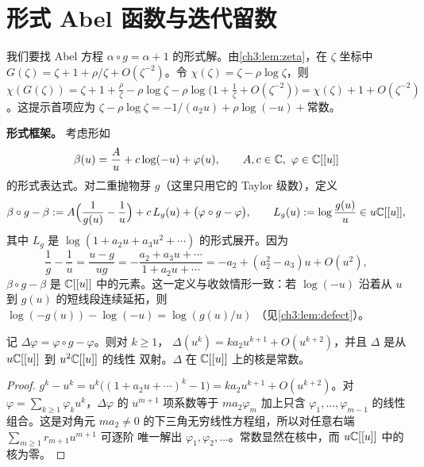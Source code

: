 \section{形式 Abel 函数与迭代留数}\label{ch3:sec:formal}

我们要找 Abel 方程 $\alpha\circ g=\alpha+1$ 的形式解。由\cref{ch3:lem:zeta}，在 $\zeta$
坐标中 $G(\zeta)=\zeta+1+\rho/\zeta+O(\zeta^{-2})$。令 $\chi(\zeta)=\zeta-\rho\log\zeta$，则
$\chi(G(\zeta))=\zeta+1+\frac\rho\zeta-\rho\log\zeta-\rho\log\bigl(1+\frac1\zeta+O(\zeta^{-2})\bigr)=\chi(\zeta)+1+O(\zeta^{-2})$。这提示首项应为
$\zeta-\rho\log\zeta=-1/(a_2u)+\rho\log(-u)+\text{常数}$。

\textbf{形式框架。} 考虑形如
\begin{equation}\label{ch3:eq:class}
 \beta(u)=\frac{A}{u}+c\log(-u)+\varphi(u),\qquad A,c\in\C,\ \varphi\in\C[[u]]
\end{equation}
的形式表达式。对二重抛物芽 $g$（这里只用它的 Taylor 级数），定义
\[
 \beta\circ g-\beta:=A\Bigl(\frac1{g(u)}-\frac1u\Bigr)+c\,L_g(u)+\bigl(\varphi\circ g-\varphi\bigr),
 \qquad L_g(u):=\log\frac{g(u)}{u}\in u\mathbb{C}[[u]] ,
\]
其中 $L_g$ 是 $\log(1+a_2u+a_3u^2+\cdots)$ 的形式展开。因为
\begin{equation}\label{ch3:eq:inv-diff}
 \frac1{g}-\frac1u=\frac{u-g}{ug}=-\frac{a_2+a_3u+\cdots}{1+a_2u+\cdots}
 =-a_2+(a_2^2-a_3)u+O(u^2),
\end{equation}
$\beta\circ g-\beta$ 是 $\mathbb{C}[[u]]$ 中的元素。这一定义与收敛情形一致：若 $\log(-u)$
沿着从 $u$ 到 $g(u)$ 的短线段连续延拓，则 $\log(-g(u))-\log(-u)=\log(g(u)/u)$
（见\cref{ch3:lem:defect}）。

\begin{lemma}[差分算子]\label{ch3:lem:Delta}
记 $\Delta\varphi=\varphi\circ g-\varphi$。则对 $k\ge1$，
$\Delta(u^k)=ka_2u^{k+1}+O(u^{k+2})$，并且 $\Delta$ 是从 $u\mathbb{C}[[u]]$ 到 $u^2\mathbb{C}[[u]]$ 的线性
双射。$\Delta$ 在 $\mathbb{C}[[u]]$ 上的核是常数。
\end{lemma}

\begin{proof}
$g^k-u^k=u^k\bigl((1+a_2u+\cdots)^k-1\bigr)=ka_2u^{k+1}+O(u^{k+2})$。对
$\varphi=\sum_{k\ge1}\varphi_ku^k$，$\Delta\varphi$ 的 $u^{m+1}$ 项系数等于
$ma_2\varphi_m$ 加上只含 $\varphi_1,\dots,\varphi_{m-1}$ 的线性组合。这是对角元
$ma_2\ne0$ 的下三角无穷线性方程组，所以对任意右端 $\sum_{m\ge1}r_{m+1}u^{m+1}$ 可逐阶
唯一解出 $\varphi_1,\varphi_2,\dots$。常数显然在核中，而 $u\mathbb{C}[[u]]$ 中的核为零。
\end{proof}

